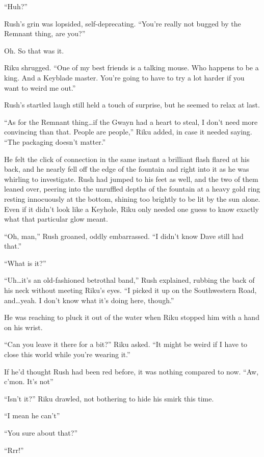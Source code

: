 ``Huh?''

Rush's grin was lopsided, self-deprecating. ``You're really not bugged by the Remnant thing, are you?''

Oh. So that was it.

Riku shrugged. ``One of my best friends is a talking mouse. Who happens to be a king. And a Keyblade master. You're going to have to try a lot harder if you want to weird me out.''

Rush's startled laugh still held a touch of surprise, but he seemed to relax at last.

``As for the Remnant thing\ldots if the Gwayn had a heart to steal, I don't need more convincing than that. People are people,'' Riku added, in case it needed saying. ``The packaging doesn't matter.''

He felt the click of connection in the same instant a brilliant flash flared at his back, and he nearly fell off the edge of the fountain and right into it as he was whirling to investigate. Rush had jumped to his feet as well, and the two of them leaned over, peering into the unruffled depths of the fountain at a heavy gold ring resting innocuously at the bottom, shining too brightly to be lit by the sun alone. Even if it didn't look like a Keyhole, Riku only needed one guess to know exactly what that particular glow meant.

``Oh, man,'' Rush groaned, oddly embarrassed. ``I didn't know Dave still had that.''

``What is it?''

``Uh\ldots it's an old-fashioned betrothal band,'' Rush explained, rubbing the back of his neck without meeting Riku's eyes. ``I picked it up on the Southwestern Road, and\ldots yeah. I don't know what it's doing here, though.''

He was reaching to pluck it out of the water when Riku stopped him with a hand on his wrist.

``Can you leave it there for a bit?'' Riku asked. ``It might be weird if I have to close this world while you're wearing it.''

If he'd thought Rush had been red before, it was nothing compared to now. ``Aw, c'mon. It's not\textemdash''

``Isn't it?'' Riku drawled, not bothering to hide his smirk this time.

``I mean he can't\textemdash''

``You sure about that?''

``Rrr!''

